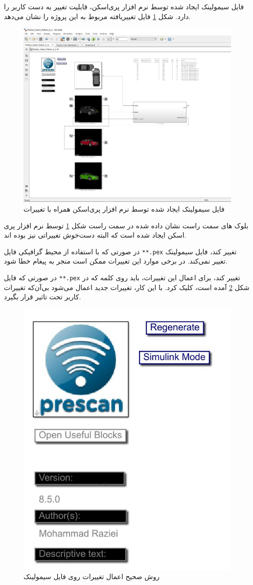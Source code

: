 فایل سیمولینک ایجاد شده توسط نرم افزار پری‌اسکن، قابلیت تغییر به دست کاربر را دارد. شکل 
\ref{fig:simulink-firstview}
فایل تغییر‌یافته مربوط به این پروژه را نشان می‌دهد.


\begin{figure}
	\centering
	\includegraphics[width=0.7\linewidth]{Figures/simulink/first_view}
	\caption{فایل سیمولینک ایجاد شده توسط نرم افزار پری‌اسکن همراه با تغییرات}
	\label{fig:simulink-firstview}
\end{figure}




بلوک های سمت راست نشان داده شده در سمت راست شکل
\ref{fig:simulink-firstview}
توسط نرم افزار پری اسکن ایجاد شده است که البته دست‌خوش تغییراتی نیز بوده اند. 

در صورتی که با استفاده از محیط گرافیکی  فایل \texttt{**.pex} تغییر کند، فایل سیمولینک تغییر نمی‌کند. در برخی موارد این تغییرات ممکن است منجر به پیغام خطا شود.

\begin{remark}\label{remark:Regenerate}
	در صورتی که فایل
	\texttt{**.pex}
	تغییر کند، برای اعمال این تغییرات، باید روی کلمه 
	که در شکل 
	\ref{fig:simulink-generate}
	آمده است، کلیک کرد. با این کار، تغییرات جدید اعمال می‌شود بی‌آن‌که تغییرات کاربر تحت تاثیر قرار بگیرد.
\end{remark}

\begin{figure}
	\centering
	\includegraphics[width=0.4\linewidth]{Figures/simulink/generate}
	\caption{روش صحیح اعمال تغییرات روی فایل سیمولینک}
	\label{fig:simulink-generate}
\end{figure}

